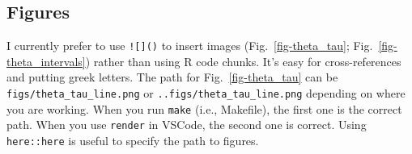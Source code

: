 \documentclass[
  12pt,
  letterpaper,
  DIV=11,
  numbers=noendperiod]{scrartcl}
\newenvironment{Shaded}{\begin{snugshade}}{\end{snugshade}}
\newcommand{\AttributeTok}[1]{\textcolor[rgb]{0.40,0.45,0.13}{#1}}
\newcommand{\ConstantTok}[1]{\textcolor[rgb]{0.56,0.35,0.01}{#1}}
\newcommand{\DecValTok}[1]{\textcolor[rgb]{0.68,0.00,0.00}{#1}}
\newcommand{\FunctionTok}[1]{\textcolor[rgb]{0.28,0.35,0.67}{#1}}
\newcommand{\NormalTok}[1]{\textcolor[rgb]{0.00,0.23,0.31}{#1}}
\newcommand{\OtherTok}[1]{\textcolor[rgb]{0.00,0.23,0.31}{#1}}
\newcommand{\SpecialCharTok}[1]{\textcolor[rgb]{0.37,0.37,0.37}{#1}}
\newcommand{\StringTok}[1]{\textcolor[rgb]{0.13,0.47,0.30}{#1}}
\begin{document}
\begin{Shaded}
\end{Shaded}

\hypertarget{figures}{%
\subsection{Figures}\label{figures}}

I currently prefer to use \texttt{!{[}{]}()} to insert images
(Fig.~\ref{fig-theta_tau}; Fig.~\ref{fig-theta_intervals}) rather than
using R code chunks. It's easy for cross-references and putting greek
letters. The path for Fig.~\ref{fig-theta_tau} can be
\texttt{figs/theta\_tau\_line.png} or
\texttt{..figs/theta\_tau\_line.png} depending on where you are working.
When you run \texttt{make} (i.e., Makefile), the first one is the
correct path. When you use \texttt{render} in VSCode, the second one is
correct. Using \texttt{here::here} is useful to specify the path to
figures.
\end{document}
